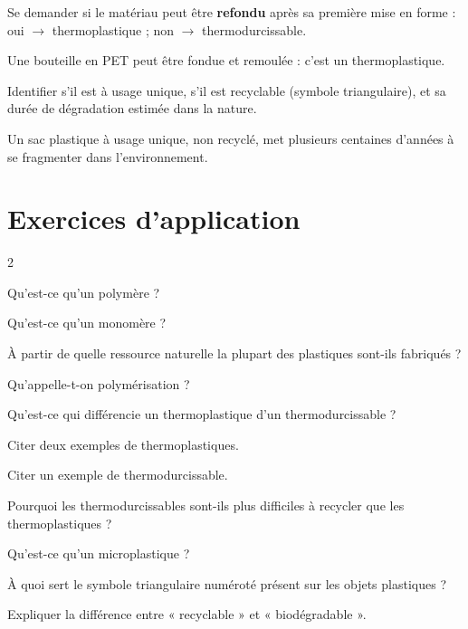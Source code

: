 Se demander si le matériau peut être \textbf{refondu} après sa première mise en forme :
oui $\to$ thermoplastique ; non $\to$ thermodurcissable.
\begin{exemple}
Une bouteille en PET peut être fondue et remoulée : c'est un thermoplastique.
\end{exemple}

Identifier s'il est à usage unique, s'il est recyclable (symbole triangulaire), et sa
durée de dégradation estimée dans la nature.
\begin{exemple}
Un sac plastique à usage unique, non recyclé, met plusieurs centaines d'années à se
fragmenter dans l'environnement.
\end{exemple}

\section{Exercices d'application}
\begin{multicols}{2}

\exo{} Qu'est-ce qu'un polymère ?

\exo{} Qu'est-ce qu'un monomère ?

\exo{} À partir de quelle ressource naturelle la plupart des plastiques sont-ils
fabriqués ?

\exo{} Qu'appelle-t-on polymérisation ?

\exo{} Qu'est-ce qui différencie un thermoplastique d'un thermodurcissable ?

\exo{} Citer deux exemples de thermoplastiques.

\exo{} Citer un exemple de thermodurcissable.

\exo{} Pourquoi les thermodurcissables sont-ils plus difficiles à recycler que
les thermoplastiques ?

\exo{} Qu'est-ce qu'un microplastique ?

\exo{} À quoi sert le symbole triangulaire numéroté présent sur les objets
plastiques ?

\exo{} Expliquer la différence entre « recyclable » et « biodégradable ».

\end{multicols}

